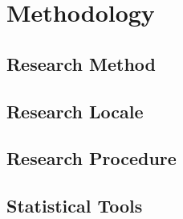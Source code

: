 \chapter{Methodology}\label{ch:3}

\section{Research Method}\label{sec:3-method}

\section{Research Locale}\label{sec:3-locale}

\section{Research Procedure}\label{sec:3-proc}

\section{Statistical Tools}\label{sec:3-stat}

